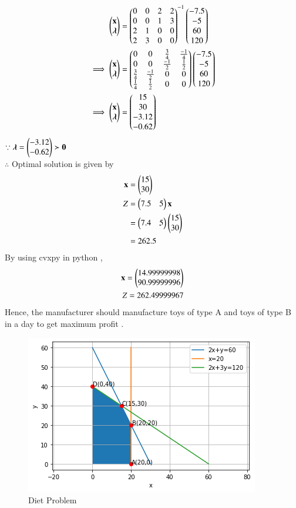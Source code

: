 \documentclass[journal,12pt,twocolumn]{IEEEtran}
\begin{document}
\begin{align}
    \begin{pmatrix}\mathbf{x} \\ \boldsymbol{\lambda}\end{pmatrix} &= \begin{pmatrix}0 & 0 & 2 & 2 \\ 0 & 0 & 1 & 3 \\ 2 & 1 & 0 & 0 \\ 2 & 3 & 0 & 0\end{pmatrix}^{-1}\begin{pmatrix}-7.5 \\ -5 \\ 60 \\ 120\end{pmatrix}
    \\
    \implies   \begin{pmatrix}\mathbf{x} \\ \boldsymbol{\lambda}\end{pmatrix} &= \begin{pmatrix}0 & 0 & \frac{3}{4} & \frac{-1}{4} \\ 0 & 0 & \frac{-1}{2} & \frac{1}{2} \\ \frac{3}{4} & \frac{-1}{2} & 0 & 0 \\ \frac{1}{4} & \frac{1}{2} & 0 & 0\end{pmatrix}\begin{pmatrix}-7.5 \\ -5 \\ 60 \\ 120\end{pmatrix}
    \\
    \implies \begin{pmatrix}\mathbf{x} \\ \boldsymbol{\lambda}\end{pmatrix} &= \begin{pmatrix}15 \\ 30 \\ -3.12 \\ -0.62\end{pmatrix}
\end{align}
$\because \boldsymbol{\lambda}=\begin{pmatrix}-3.12 \\ -0.62\end{pmatrix} \succ \mathbf{0} $
\\
$\therefore$ Optimal solution is given by
\begin{align}
    \mathbf{x} &= \begin{pmatrix}15\\30\end{pmatrix} \\
    Z &= \begin{pmatrix}7.5 & 5\end{pmatrix}\mathbf{x} \\
    &= \begin{pmatrix}7.4 & 5\end{pmatrix}\begin{pmatrix}15 \\ 30\end{pmatrix} \\
    &= 262.5
\end{align}
By using cvxpy in python ,
\begin{align}
    \mathbf{x}=\begin{pmatrix}14.99999998\\90.99999996\end{pmatrix}\\
    Z = 262.49999967
\end{align}
Hence, the manufacturer should manufacture  toys of type A and  toys of type B in a day to get maximum profit .
\begin{figure}[!ht]
\centering
\includegraphics[width=\columnwidth]{Figure10}
\caption{Diet Problem}
\label{fig:toy problem}	
\end{figure}
\end{document}
